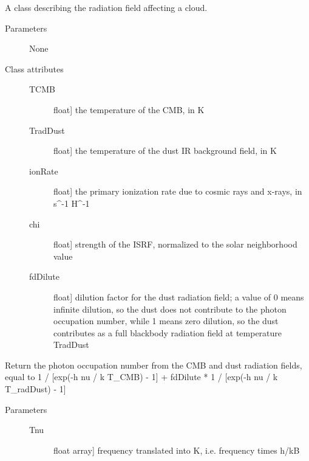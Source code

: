\documentclass[letterpaper,10pt,english]{sphinxmanual}
\begin{document}
\begin{fulllineitems}
\label{fulldoc:despotic.radiation}
A class describing the radiation field affecting a cloud.
\begin{description}
\item[{Parameters}] \leavevmode
None

\item[{Class attributes}] \leavevmode\begin{description}
\item[{TCMB}] \leavevmode{[}float{]}
the temperature of the CMB, in K

\item[{TradDust}] \leavevmode{[}float{]}
the temperature of the dust IR background field, in K

\item[{ionRate}] \leavevmode{[}float{]}
the primary ionization rate due to cosmic rays and x-rays, in
s\textasciicircum{}-1 H\textasciicircum{}-1

\item[{chi}] \leavevmode{[}float{]}
strength of the ISRF, normalized to the solar neighborhood
value

\item[{fdDilute}] \leavevmode{[}float{]}
dilution factor for the dust radiation field; a value of 0
means infinite dilution, so the dust does not contribute to the
photon occupation number, while 1 means zero dilution, so
the dust contributes as a full blackbody radiation field at
temperature TradDust

\end{description}

\end{description}

\begin{fulllineitems}
\label{fulldoc:despotic.radiation.ngamma}
Return the photon occupation number from the CMB and dust
radiation fields, equal to 
1 / {[}exp(-h nu / k T\_CMB) - 1{]} + 
fdDilute * 1 / {[}exp(-h nu / k T\_radDust) - 1{]}
\begin{description}
\item[{Parameters}] \leavevmode\begin{description}
\item[{Tnu}] \leavevmode{[}float \textbar{} array{]}
frequency translated into K, i.e. frequency times h/kB


\end{description}
\end{description}
\end{fulllineitems}
\end{fulllineitems}
\end{document}
